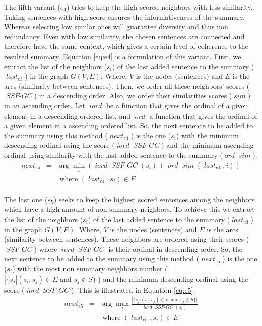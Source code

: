 \documentclass[12pt, oneside, a4paper]{article}
\DeclareMathOperator{\ssfgc}{\textit{SSF-GC}}
\DeclareMathOperator{\ord}{\textit{ord}}
\DeclareMathOperator{\iord}{\textit{iord}}
\DeclareMathOperator{\simil}{\textit{sim}}
\DeclareMathOperator{\nextsent}{\textit{next}}
\DeclareMathOperator{\lastsent}{\textit{last}}
\begin{document}
The fifth variant ($ e_4 $) tries to keep the high scored neighbors with less similarity. 
Taking sentences with high score ensures the informativeness of the summary. 
Whereas selecting low similar ones will guarantee diversity and thus non redundancy. 
Even with low similarity, the chosen sentences are connected and therefore have the same context, which gives a certain level of coherence to the resulted summary.
Equation \ref{eq:e4} is a formulation of this variant.
First, we extract the list of the neighbors ($s_i$) of the last added sentence to the summary ($\lastsent_{e3}$) in the graph $ G(V, E) $.
Where, $ V $ is the nodes (sentences) and $ E $ is the arcs (similarity between sentences). 
Then, we order all these neighbors' scores ($\ssfgc$) in a descending order. 
Also, we order their similarities scores ($\simil$) in an ascending order. 
Let $ \iord $ be a function that gives the ordinal of a given element in a descending ordered list, and $ \ord $ a function that gives the ordinal of a given element in a ascending ordered list.
So, the next sentence to be added to the summary using this method ($\nextsent_{e4}$) is the one ($s_i$) with the minimum descending ordinal using the score ($\iord\ssfgc$) and the minimum ascending ordinal using similarity with the last added sentence to the summary ($\ord\simil$).
\begin{equation}
\begin{aligned}
\nextsent_{e4} & = & \arg\min\limits_i (\iord\ssfgc(s_i) + \ord\simil(\lastsent_{e4}, i)) \\
&& \text{ where } (\lastsent_{e4}, s_i) \in E \\
\end{aligned}
\label{eq:e4}
\end{equation}

The last one ($ e_5 $) seeks to keep the highest scored sentences among the neighbors which have a high amount of non-summary neighbors. 
To achieve this we extract the list of the neighbors ($s_i$) of the last added sentence to the summary ($\lastsent_{e3}$) in the graph $ G(V, E) $.
Where, $ V $ is the nodes (sentences) and $ E $ is the arcs (similarity between sentences).
These neighbors are ordered using their scores ($\ssfgc$) where $\iord\ssfgc$ is their ordinal in descending order.
So, the next sentence to be added to the summary using this method ($\nextsent_{e5}$) is the one ($s_i$) with the most non summary neighbors number ($|\{ s_j | (s_i, s_j) \in E \text{ and } s_j \notin S \}|$) and the minimum descending ordinal using the score ($\iord\ssfgc$).
This is illustrated in Equation \ref{eq:e5}.
\begin{equation}
\begin{aligned}
\nextsent_{e5} & = & \arg\max\limits_i \frac{|\{ s_j | (s_i, s_j) \in E \text{ and } s_j \notin S \}|}{\iord\ssfgc(s_i)} \\
&& \text{ where } (\lastsent_{e5}, s_i) \in E \\
\end{aligned}
\label{eq:e5}
\end{equation}
\end{document}
